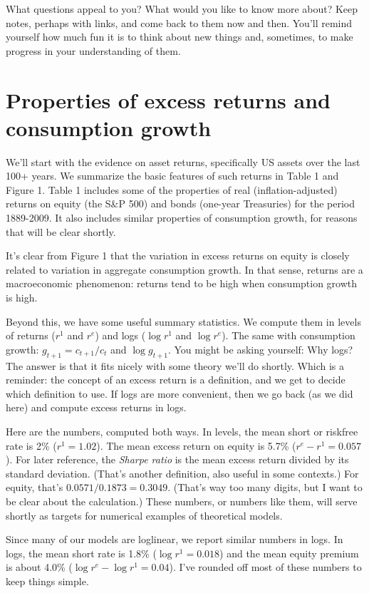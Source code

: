 \documentclass[11pt]{article}
\begin{document}
%
What questions appeal to you?
What would you like to know more about?
Keep notes, perhaps with links,
and come back to them now and then.
You'll remind yourself how much fun it is to think about new things
and, sometimes, to make progress in your understanding of them.


\section{Properties of excess returns and consumption growth}

We'll start with the evidence on asset returns,
specifically US assets over the last 100+ years.
We summarize the basic features of such returns in Table 1 and Figure 1.
Table 1 includes some of the properties of
real (inflation-adjusted) returns on equity (the S\&P 500)
and bonds (one-year Treasuries) for the period 1889-2009.
It also includes similar properties of consumption growth,
for reasons that will be clear shortly.

It's clear from Figure 1 that the variation in excess returns on equity
is closely related to variation in aggregate consumption growth.
In that sense, returns are a macroeconomic phenomenon:
returns tend to be high when consumption growth is high.

Beyond this, we have some useful summary statistics.
We compute them in levels of returns ($r^1$ and $r^e$)
and logs ($\log r^1$ and $\log r^e$).
The same with consumption growth:  $g_{t+1} = c_{t+1}/c_t$
and $\log g_{t+1}$.
You might be asking yourself:  Why logs?
The answer is that it fits nicely with some theory we'll do shortly.
Which is a reminder:  the concept of an excess return is a definition,
and we get to decide which definition to use.
If logs are more convenient, then we go back (as we did here)
and compute excess returns in logs.

Here are the numbers, computed both ways.
In levels, the mean short or riskfree rate is  2\% ($r^1 = 1.02$).
The mean excess return on equity is 5.7\% ($r^e - r^1 = 0.057$).
For later reference, the {\it Sharpe ratio\/}
is the mean excess return divided by its standard deviation.
(That's another definition, also useful in some contexts.)
For equity, that's $ 0.0571/0.1873 = 0.3049$.
(That's way too many digits, but I want to be clear about the calculation.)
These numbers, or numbers like them,
will serve shortly as targets for numerical examples
of theoretical models.


Since many of our models are loglinear, we report similar numbers in logs.
In logs, the mean short rate is 1.8\% ($\log r^1 = 0.018$)
and the mean equity premium is about 4.0\% ($\log r^e - \log r^1 = 0.04$).
I've rounded off most of these numbers to keep things simple.
\end{document}
